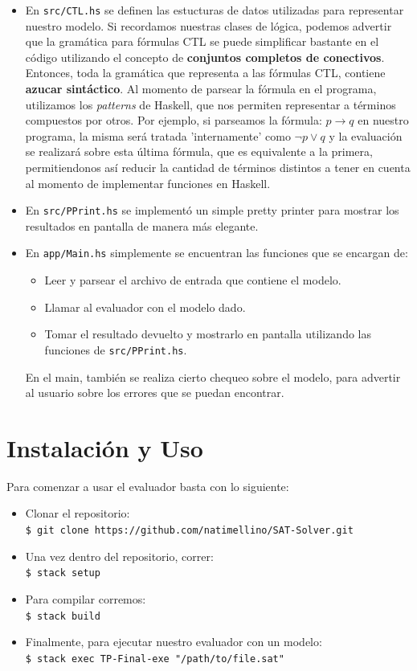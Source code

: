 \documentclass[11pt]{article}
\begin{document}
\begin{itemize}
  \item En \texttt{src/CTL.hs} se definen las estucturas de datos
        utilizadas para representar nuestro modelo. Si recordamos 
        nuestras clases de lógica, podemos advertir que la gramática para fórmulas CTL
        se puede simplificar bastante en el código utilizando el concepto de \textbf{conjuntos completos de conectivos}.
        Entonces, toda la gramática que representa a las fórmulas CTL, contiene
        \textbf{azucar sintáctico}. Al momento de parsear la fórmula en el programa, 
        utilizamos los \emph{patterns} de Haskell, que nos permiten representar a términos
        compuestos por otros. Por ejemplo, si parseamos la fórmula:
        $p \rightarrow q$ en nuestro programa, la misma será tratada 'internamente' como 
        $\neg p \lor q$ y la evaluación se realizará sobre esta última fórmula, 
        que es equivalente a la primera, permitiendonos así reducir la cantidad de términos
        distintos a tener en cuenta al momento de implementar funciones en Haskell. 
  \item En \texttt{src/PPrint.hs} se implementó un simple pretty printer
        para mostrar los resultados en pantalla de manera más elegante.
  \item En \texttt{app/Main.hs} simplemente se encuentran las funciones que
        se encargan de:
        \begin{itemize}
          \item Leer y parsear el archivo de entrada que contiene el modelo.
          \item Llamar al evaluador con el modelo dado.
          \item Tomar el resultado devuelto y mostrarlo en pantalla utilizando 
          las funciones de \texttt{src/PPrint.hs}.
        \end{itemize}
        En el main, también se realiza cierto chequeo sobre el modelo, para
        advertir al usuario sobre los errores que se puedan encontrar.
\end{itemize}

\section{Instalación y Uso}

Para comenzar a usar el evaluador basta con lo siguiente:

\begin{itemize}
  \item Clonar el repositorio: \\
        \texttt{\$ git clone https://github.com/natimellino/SAT-Solver.git}
  \item Una vez dentro del repositorio, correr: \\
        \texttt{\$ stack setup}
  \item Para compilar corremos: \\
        \texttt{\$ stack build}
  \item Finalmente, para ejecutar nuestro evaluador con un modelo: \\
        \texttt{\$ stack exec TP-Final-exe "/path/to/file.sat"}
\end{itemize}
\end{document}
